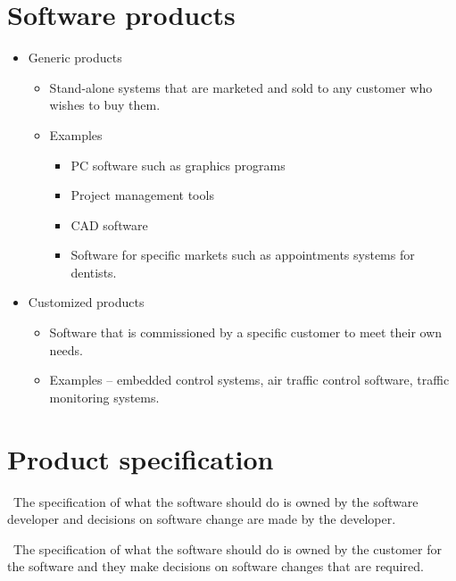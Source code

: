 \documentclass{report}
\begin{document}
\section{Software products}
\begin{itemize}
  \setlength\itemsep{-.25em}
  \item Generic products
    \begin{itemize}
      \setlength\itemsep{-.25em}
      \item Stand-alone systems that are marketed and sold to any customer who
wishes to buy them.
      \item Examples
        \begin{itemize}
          \setlength\itemsep{-.25em}
          \item PC software such as graphics programs
          \item Project management tools
          \item CAD software
          \item Software for specific markets such as appointments systems for dentists.
        \end{itemize}
    \end{itemize}
  \item Customized products
    \begin{itemize}
      \setlength\itemsep{-.25em}
      \item Software that is commissioned by a specific customer to meet their own needs.
      \item Examples – embedded control systems, air traffic control software, traffic monitoring systems.
    \end{itemize}
\end{itemize}

\section{Product specification}
\begin{description}
  \setlength\itemsep{-.25em}
  \item [Generic products] \
  The specification of what the software should do is owned by the software developer and decisions on software change are made by the developer.
  \item [Customized products] \
  The specification of what the software should do is owned by the customer for the software and they make decisions on software changes that are required.
\end{description}
\end{document}
